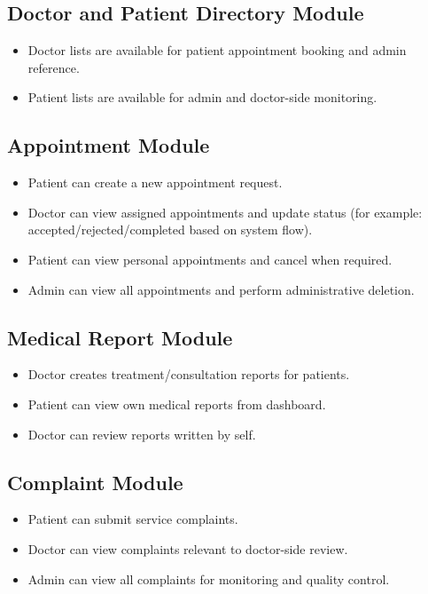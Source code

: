 \documentclass[12pt,a4paper]{article}
\begin{document}
\subsection{Doctor and Patient Directory Module}
\begin{itemize}[leftmargin=1.2cm]
    \item Doctor lists are available for patient appointment booking and admin reference.
    \item Patient lists are available for admin and doctor-side monitoring.
\end{itemize}

\subsection{Appointment Module}
\begin{itemize}[leftmargin=1.2cm]
    \item Patient can create a new appointment request.
    \item Doctor can view assigned appointments and update status (for example: accepted/rejected/completed based on system flow).
    \item Patient can view personal appointments and cancel when required.
    \item Admin can view all appointments and perform administrative deletion.
\end{itemize}

\subsection{Medical Report Module}
\begin{itemize}[leftmargin=1.2cm]
    \item Doctor creates treatment/consultation reports for patients.
    \item Patient can view own medical reports from dashboard.
    \item Doctor can review reports written by self.
\end{itemize}

\subsection{Complaint Module}
\begin{itemize}[leftmargin=1.2cm]
    \item Patient can submit service complaints.
    \item Doctor can view complaints relevant to doctor-side review.
    \item Admin can view all complaints for monitoring and quality control.
\end{itemize}
\end{document}
